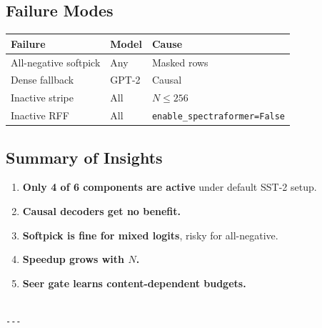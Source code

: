\subsection{Failure Modes}

\begin{table}[H]
\centering
\small
\begin{tabular}{lll}
\toprule
\textbf{Failure} & \textbf{Model} & \textbf{Cause} \\
\midrule
All-negative softpick & Any & Masked rows \\
Dense fallback & GPT-2 & Causal \\
Inactive stripe & All & $N \leq 256$ \\
Inactive RFF & All & \texttt{enable\_spectraformer=False} \\
\bottomrule
\end{tabular}
\end{table}

\subsection{Summary of Insights}

\begin{enumerate}
\item \textbf{Only 4 of 6 components are active} under default SST-2 setup.
\item \textbf{Causal decoders get no benefit.}
\item \textbf{Softpick is fine for mixed logits}, risky for all-negative.
\item \textbf{Speedup grows with $N$.}
\item \textbf{Seer gate learns content-dependent budgets.}
\end{enumerate}
\begin{lstlisting}

---
\end{lstlisting}